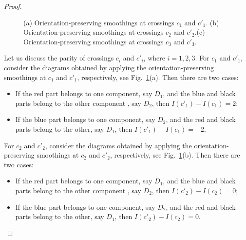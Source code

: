 \documentclass[10pt,a4paper]{amsart}
\numberwithin{equation}{section}
\numberwithin{equation}{section}
\begin{document}
\begin{proof}
\begin{figure}[!ht]
		\caption{(a) Orientation-preserving smoothings at crossings $c_1$ and $c'_1$. (b) Orientation-preserving smoothings at crossings $c_2$ and $c'_2$.(c) Orientation-preserving smoothings at crossings $c_3$ and $c'_3$.} \label{fig2244}
	\end{figure}
	
	Let us discuss the parity of crossings $c_i$ and $c'_i$, where $i=1, 2, 3$. For $c_1$ and $c'_1$, consider the diagrams obtained by applying the orientation-preserving smoothings at $c_1$ and $c'_1$, respectively, see Fig.~\ref{fig2244}(a). Then there are two cases:
	\begin{itemize}
		\item[{(1)}] If the red part belongs to one component, say $D_1$, and the blue and black parts belong to the other component , say $D_2$, then $I(c'_1) - I(c_1) = 2$;
		\item[{(2)}] If the blue part belongs to one component, say $D_2$, and the red and black parts belong to the other, say $D_1$, then $I(c'_1) - I(c_1) = -2$.
	\end{itemize}
	
	For $c_2$ and $c'_2$, consider the diagrams obtained by applying the orientation-preserving smoothings at $c_2$ and $c'_2$, respectively, see Fig.~\ref{fig2244}(b). Then there are two cases:
	\begin{itemize}
		\item[{(1)}] If the red part belongs to one component, say $D_1$, and the blue and black parts belong to the other component , say $D_2$, then $I(c'_2) - I(c_2) = 0$;
		\item[{(2)}] If the blue part belongs to one component, say $D_2$, and the red and black parts belong to the other, say $D_1$, then $I(c'_2) - I(c_2) = 0$.
	\end{itemize}
	

\end{proof}
\end{document}

